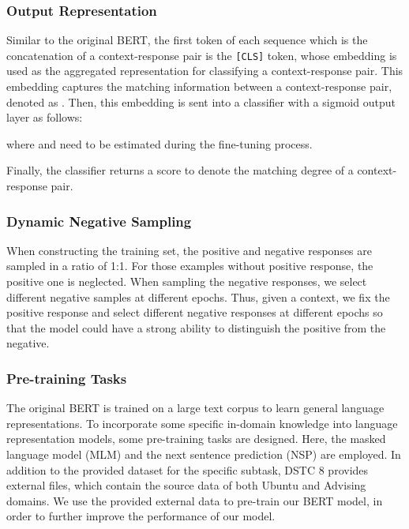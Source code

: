 \documentclass[letterpaper]{article} \usepackage{aaai20}  \usepackage{times}  \usepackage{helvet} \usepackage{courier}  \usepackage[hyphens]{url}  \usepackage{graphicx} \urlstyle{rm} \def\UrlFont{\rm}  \usepackage{graphicx}  \frenchspacing  \setlength{\pdfpagewidth}{8.5in}  \setlength{\pdfpageheight}{11in}
\begin{document}
  \subsubsection{Output Representation}
    Similar to the original BERT, the first token of each sequence which is the concatenation of a context-response pair is the \texttt{[CLS]} token, whose embedding is used as the aggregated representation for classifying a context-response pair.
    This embedding captures the matching information between a context-response pair, denoted as .
    Then, this embedding is sent into a classifier with a sigmoid output layer as follows:
    
    where  and  need to be estimated during the fine-tuning process.

    Finally, the classifier returns a score  to denote the matching degree of a context-response pair.

  \subsubsection{Dynamic Negative Sampling}
    When constructing the training set, the positive and negative responses are sampled in a ratio of 1:1.
    For those examples without positive response, the positive one is neglected.
    When sampling the negative responses, we select different negative samples at different epochs.
    Thus, given a context, we fix the positive response and select different negative responses at different epochs so that the model could have a strong ability to distinguish the positive from the negative.

  \subsubsection{Pre-training Tasks}
    The original BERT is trained on a large text corpus to learn general language representations.
    To incorporate some specific in-domain knowledge into language representation models, some pre-training tasks are designed.
    Here, the masked language model (MLM) and the next sentence prediction (NSP) \cite{DBLP:conf/naacl/DevlinCLT19} are employed.
    In addition to the provided dataset for the specific subtask, DSTC 8 provides external files, which contain the source data of both Ubuntu and Advising domains.
    We use the provided external data to pre-train our BERT model, in order to further improve the performance of our model.
\end{document}
